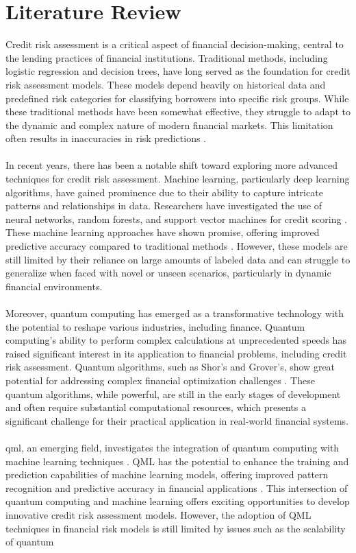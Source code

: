 \section{Literature Review}
Credit risk assessment is a critical aspect of financial decision-making, central to the lending practices of financial institutions. Traditional methods, including logistic regression and decision trees, have long served as the foundation for credit risk assessment models. These models depend heavily on historical data and predefined risk categories for classifying borrowers into specific risk groups. While these traditional methods have been somewhat effective, they struggle to adapt to the dynamic and complex nature of modern financial markets. This limitation often results in inaccuracies in risk predictions \cite{Marqués20131384}.\\\\In recent years, there has been a notable shift toward exploring more advanced techniques for credit risk assessment. Machine learning, particularly deep learning algorithms, have gained prominence due to their ability to capture intricate patterns and relationships in data. Researchers have investigated the use of neural networks, random forests, and support vector machines for credit scoring \cite{GOLBAYANI2020101251}. These machine learning approaches have shown promise, offering improved predictive accuracy compared to traditional methods \cite{thakkar2024improved} \cite{schuld2019quantum}. However, these models are still limited by their reliance on large amounts of labeled data and can struggle to generalize when faced with novel or unseen scenarios, particularly in dynamic financial environments.\\\\Moreover, quantum computing has emerged as a transformative technology with the potential to reshape various industries, including finance. Quantum computing's ability to perform complex calculations at unprecedented speeds has raised significant interest in its application to financial problems, including credit risk assessment. Quantum algorithms, such as Shor's and Grover's, show great potential for addressing complex financial optimization challenges \cite{Shor2002} \cite{Grover1996}. These quantum algorithms, while powerful, are still in the early stages of development and often require substantial computational resources, which presents a significant challenge for their practical application in real-world financial systems.\\\\ \gls{qml}, an emerging field, investigates the integration of quantum computing with machine learning techniques \cite{jha2020quantum} \cite{farhi2018classification}. QML has the potential to enhance the training and prediction capabilities of machine learning models, offering improved pattern recognition and predictive accuracy in financial applications \cite{lloyd2013quantum} \cite{Schuld2019}. This intersection of quantum computing and machine learning offers exciting opportunities to develop innovative credit risk assessment models. However, the adoption of QML techniques in financial risk models is still limited by issues such as the scalability of quantum 
